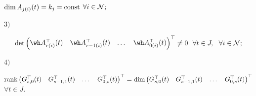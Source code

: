 \begin{thm}
$\dim A_{j(i)}(t)=k_j=\operatorname{const}$ \; $\forall i \in \cal N ;$





\noindent{}$3)$


\begin{equation}


\det


\begin{pmatrix}


\wh A_{r(i)}^\top(t) & \wh A_{r-1(i)}^\top(t) & \dotsc & \wh


A_{0(i)}^\top(t) \end{pmatrix}^\top \ne 0 \ \ \forall t \in J, \ \


\forall i \in \cal N;


\end{equation}





\noindent{}$4)$


$\rank \begin{pmatrix} G_{s,0}^\top(t) & G_{s-1,1}^\top(t) & \dotsc &


G_{0,s}^\top(t) \end{pmatrix}^\top =\dim


\begin{pmatrix} G_{s,0}^\top(t) & G_{s-1,1}^\top(t) & \dotsc &


G_{0,s}^\top(t) \end{pmatrix}^\top$ \; $\forall t \in J.$


\end{thm}





